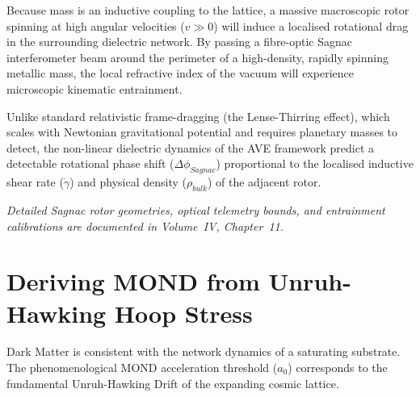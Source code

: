 Because mass is an inductive coupling to the lattice, a massive macroscopic rotor spinning at high angular velocities ($v \gg 0$) will induce a localised rotational drag in the surrounding dielectric network. By passing a fibre-optic Sagnac interferometer beam around the perimeter of a high-density, rapidly spinning metallic mass, the local refractive index of the vacuum will experience microscopic kinematic entrainment.

Unlike standard relativistic frame-dragging (the Lense-Thirring effect), which scales with Newtonian gravitational potential and requires planetary masses to detect, the non-linear dielectric dynamics of the AVE framework predict a detectable rotational phase shift ($\Delta\phi_{Sagnac}$) proportional to the localised inductive shear rate ($\dot{\gamma}$) and physical density ($\rho_{bulk}$) of the adjacent rotor. 

\textit{Detailed Sagnac rotor geometries, optical telemetry bounds, and entrainment calibrations are documented in Volume~IV, Chapter~11.}

\section{Deriving MOND from Unruh-Hawking Hoop Stress}
\label{sec:galactic_saturation}

Dark Matter is consistent with the network dynamics of a
saturating substrate. The phenomenological MOND acceleration threshold ($a_{0}$)
corresponds to the fundamental Unruh-Hawking Drift of
the expanding cosmic lattice.

